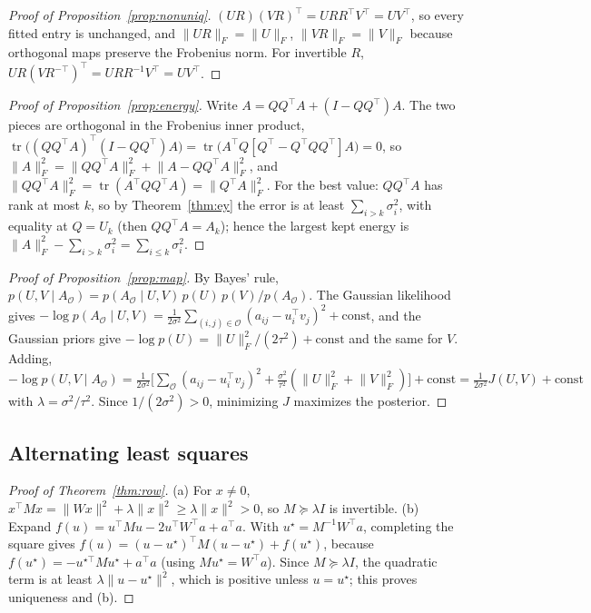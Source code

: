 \documentclass[10pt]{article}
\theoremstyle{plain}
\theoremstyle{definition}
\theoremstyle{remark}
\newcommand{\T}{^{\top}}
\newcommand{\fro}[1]{\lVert #1\rVert_F}
\newcommand{\norm}[1]{\lVert #1\rVert}
\newcommand{\obs}{\mathcal{O}}
\DeclareMathOperator{\tr}{tr}
\begin{document}
\begin{proof}[Proof of Proposition~\ref{prop:nonuniq}]
$(UR)(VR)\T=URR\T V\T=UV\T$, so every fitted entry is unchanged, and $\fro{UR}=\fro U$, $\fro{VR}=\fro V$ because orthogonal maps preserve the Frobenius norm. For invertible $R$, $UR(VR^{-\top})\T=URR^{-1}V\T=UV\T$.
\end{proof}

\begin{proof}[Proof of Proposition~\ref{prop:energy}]
Write $A=QQ\T A+(I-QQ\T)A$. The two pieces are orthogonal in the Frobenius inner product, $\tr\bigl((QQ\T A)\T(I-QQ\T)A\bigr)=\tr\bigl(A\T Q[Q\T-Q\T QQ\T]A\bigr)=0$, so $\fro A^2=\fro{QQ\T A}^2+\fro{A-QQ\T A}^2$, and $\fro{QQ\T A}^2=\tr(A\T QQ\T A)=\fro{Q\T A}^2$. For the best value: $QQ\T A$ has rank at most $k$, so by Theorem~\ref{thm:ey} the error is at least $\sum_{i>k}\sigma_i^2$, with equality at $Q=U_k$ (then $QQ\T A=A_k$); hence the largest kept energy is $\fro A^2-\sum_{i>k}\sigma_i^2=\sum_{i\le k}\sigma_i^2$.
\end{proof}

\begin{proof}[Proof of Proposition~\ref{prop:map}]
By Bayes' rule, $p(U,V\mid A_\obs)=p(A_\obs\mid U,V)\,p(U)\,p(V)/p(A_\obs)$. The Gaussian likelihood gives $-\log p(A_\obs\mid U,V)=\frac1{2\sigma^2}\sum_{(i,j)\in\obs}(a_{ij}-u_i\T v_j)^2+\text{const}$, and the Gaussian priors give $-\log p(U)=\fro U^2/(2\tau^2)+\text{const}$ and the same for $V$. Adding, $-\log p(U,V\mid A_\obs)=\frac1{2\sigma^2}\bigl[\sum_{\obs}(a_{ij}-u_i\T v_j)^2+\frac{\sigma^2}{\tau^2}(\fro U^2+\fro V^2)\bigr]+\text{const}=\frac1{2\sigma^2}J(U,V)+\text{const}$ with $\lambda=\sigma^2/\tau^2$. Since $1/(2\sigma^2)>0$, minimizing $J$ maximizes the posterior.
\end{proof}

\subsection{Alternating least squares}

\begin{proof}[Proof of Theorem~\ref{thm:row}]
(a) For $x\ne0$, $x\T Mx=\norm{Wx}^2+\lambda\norm x^2\ge\lambda\norm x^2>0$, so $M\succeq\lambda I$ is invertible.
(b) Expand $f(u)=u\T Mu-2u\T W\T a+a\T a$. With $u^\star=M^{-1}W\T a$, completing the square gives $f(u)=(u-u^\star)\T M(u-u^\star)+f(u^\star)$, because $f(u^\star)=-u^{\star\top}Mu^\star+a\T a$ (using $Mu^\star=W\T a$). Since $M\succeq\lambda I$, the quadratic term is at least $\lambda\norm{u-u^\star}^2$, which is positive unless $u=u^\star$; this proves uniqueness and (b).
\end{proof}
\end{document}
